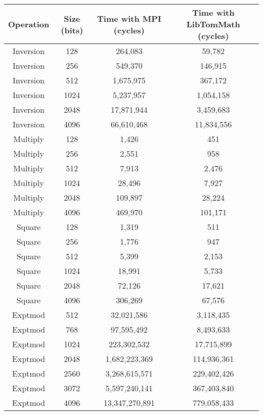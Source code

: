 \documentclass{article}
\begin{document}
\begin{small}
\begin{center}
\begin{tabular}{c|c|c|c}
\hline \textbf{Operation} & \textbf{Size (bits)} & \textbf{Time with MPI (cycles)} & \textbf{Time with LibTomMath (cycles)} \\
\hline
Inversion & 128 & 264,083  & 59,782   \\
Inversion & 256 & 549,370  & 146,915   \\
Inversion & 512 & 1,675,975  & 367,172   \\
Inversion & 1024 & 5,237,957  & 1,054,158   \\
Inversion & 2048 & 17,871,944  & 3,459,683   \\
Inversion & 4096 & 66,610,468  & 11,834,556   \\
\hline
Multiply & 128 & 1,426   & 451     \\
Multiply & 256 & 2,551   & 958     \\
Multiply & 512 & 7,913   & 2,476     \\
Multiply & 1024 & 28,496   & 7,927   \\
Multiply & 2048 & 109,897   & 28,224     \\
Multiply & 4096 & 469,970   & 101,171     \\
\hline 
Square & 128 & 1,319   & 511     \\
Square & 256 & 1,776   & 947     \\
Square & 512 & 5,399  & 2,153    \\
Square & 1024 & 18,991  & 5,733     \\
Square & 2048 & 72,126  & 17,621    \\
Square & 4096 & 306,269  & 67,576   \\
\hline 
Exptmod & 512 & 32,021,586  & 3,118,435 \\
Exptmod & 768 & 97,595,492  & 8,493,633 \\
Exptmod & 1024 & 223,302,532  & 17,715,899     \\
Exptmod & 2048 & 1,682,223,369   & 114,936,361      \\
Exptmod & 2560 & 3,268,615,571   & 229,402,426       \\
Exptmod & 3072 & 5,597,240,141   & 367,403,840      \\
Exptmod & 4096 & 13,347,270,891   & 779,058,433      

\end{tabular}
\end{center}
\end{small}
\end{document}
